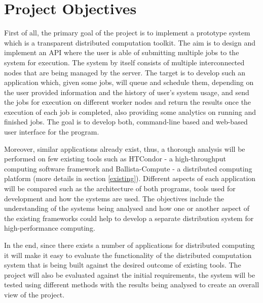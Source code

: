 \documentclass[10pt]{report}
\begin{document}
\section{Project Objectives} \label{objectives}

First of all, the primary goal of the project is to implement a prototype system which is a transparent distributed computation toolkit. The aim is to design and implement an API where the user is able of submitting multiple jobs to the system for execution. The system by itself consists of multiple interconnected nodes that are being managed by the server. The target is to develop such an application which, given some jobs, will queue and schedule them, depending on the user provided information and the history of user's system usage, and send the jobs for execution on different worker nodes and return the results once the execution of each job is completed, also providing some analytics on running and finished jobs. The goal is to develop both, command-line based and web-based user interface for the program.
\newline

Moreover, similar applications already exist, thus, a thorough analysis will be performed on few existing tools such as HTCondor - a high-throughput computing software framework and Ballista-Compute - a distributed computing platform (more details in section \ref{existing}). Different aspects of each application will be compared such as the architecture of both programs, tools used for development and how the systems are used. The objectives include the understanding of the systems being analysed and how one or another aspect of the existing frameworks could help to develop a separate distribution system for high-performance computing.
\newline

In the end, since there exists a number of applications for distributed computing it will make it easy to evaluate the functionality of the distributed computation system that is being built against the desired outcome of existing tools. The project will also be evaluated against the initial requirements, the system will be tested using different methods with the results being analysed to create an overall view of the project.

\end{document}
